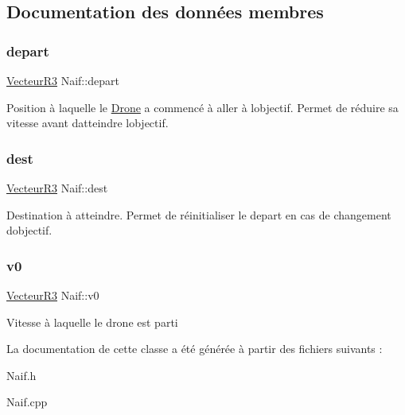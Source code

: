\subsection{Documentation des données membres}
\mbox{\label{class_naif_a0fde7dd2f98b4c8f163866ba7cd7d489}} 
\subsubsection{\texorpdfstring{depart}{depart}}
{\footnotesize\ttfamily \mbox{\hyperlink{class_vecteur_r3}{Vecteur\+R3}} Naif\+::depart}

Position à laquelle le \mbox{\hyperlink{class_drone}{Drone}} a commencé à aller à l\textquotesingle{}objectif. Permet de réduire sa vitesse avant d\textquotesingle{}atteindre l\textquotesingle{}objectif. \mbox{\label{class_naif_a330eb7baf76efe3f36b7779669cccf64}} 
\subsubsection{\texorpdfstring{dest}{dest}}
{\footnotesize\ttfamily \mbox{\hyperlink{class_vecteur_r3}{Vecteur\+R3}} Naif\+::dest}

Destination à atteindre. Permet de réinitialiser le depart en cas de changement d\textquotesingle{}objectif. \mbox{\label{class_naif_a11d7d76e77efcb9a2f47c4154bbfd55e}} 
\subsubsection{\texorpdfstring{v0}{v0}}
{\footnotesize\ttfamily \mbox{\hyperlink{class_vecteur_r3}{Vecteur\+R3}} Naif\+::v0}

Vitesse à laquelle le drone est parti 

La documentation de cette classe a été générée à partir des fichiers suivants \+:\begin{DoxyCompactItemize}
\item 
Naif.\+h\item 
Naif.\+cpp\end{DoxyCompactItemize}
